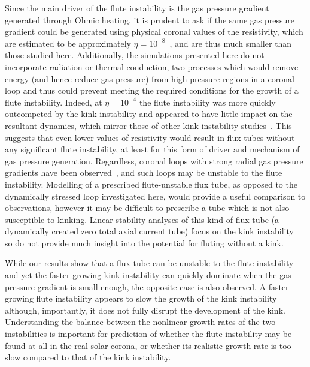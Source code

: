 \documentclass[fleqn,usenatbib]{mnras}
\newcommand{\rev}[1]{{\color{red} {#1}}}
\begin{document}
Since the main driver of the flute instability is the \rev{gas} pressure gradient
generated through Ohmic heating, it is prudent to ask if the same
\rev{gas} pressure
gradient could be generated using physical coronal values of the resistivity,
which are estimated to be approximately
$\eta=10^{-8}$~\citep{craigAnisotropicViscousDissipation2009a}, and are thus
much smaller than those studied here. Additionally, the simulations presented
here do not incorporate radiation or thermal conduction, two processes which
would remove energy (and hence reduce \rev{gas} pressure) from high-pressure regions in
a coronal loop and thus could prevent meeting the required conditions for the
growth of a flute instability. Indeed, at $\eta=10^{-4}$ the flute instability
was more quickly outcompeted by the kink instability and appeared to have
little impact on the resultant dynamics, which mirror those of other kink
instability studies~\citep{hoodCoronalHeatingMagnetic2009}. This suggests
that even lower values of resistivity would result in flux tubes without any
significant flute instability, at least for this form of driver and mechanism
of \rev{gas} pressure generation. Regardless, coronal loops with
strong radial \rev{gas} pressure
gradients have been observed~\citep{foukalTemperatureStructurePressure1975},
and such loops may be unstable to the flute instability. Modelling of
a prescribed flute-unstable flux tube, as opposed to the dynamically stressed
loop investigated here, would provide a useful comparison to observations,
however it may be difficult to prescribe a tube which is not also susceptible
to kinking. Linear stability analyses of this kind of flux tube (a dynamically
created zero total axial current tube) focus on the kink
instability~\citep{browningSolarCoronalHeating2003b} so do not provide much
insight into the potential for fluting without a kink. 

While our results show that a flux tube can be unstable to the flute
instability and yet the faster growing kink instability can quickly dominate
when the \rev{gas} pressure gradient is small enough, the opposite case is also observed.
A faster growing flute instability appears to slow the growth of the kink
instability although, importantly, it does not fully disrupt the development of
the kink. Understanding the balance between the nonlinear growth rates of the
two instabilities is important for prediction of whether the flute instability
may be found at all in the real solar corona, or whether its realistic growth
rate is too slow compared to that of the kink instability. 
\end{document}
